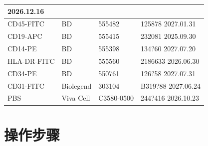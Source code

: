 \documentclass[UTF8,10pt,a4paper,fontset=fandol]{ctexart}
\newcommand{\fieldvalue}[1]{#1}
\newcommand{\handwritten}[1]{#1}
\begin{document}
\begin{center}
\begin{tabularx}{\textwidth}{|p{}|p{}|X|X|}
\fieldvalue{\handwritten{2026.12.16}} \\ \hline
CD45-FITC & BD & 555482 &
\fieldvalue{\handwritten{125878}}\quad
\fieldvalue{\handwritten{2027.01.31}} \\ \hline
CD19-APC & BD & 555415 &
\fieldvalue{\handwritten{232081}}\quad
\fieldvalue{\handwritten{2025.09.30}} \\ \hline
CD14-PE & BD & 555398 &
\fieldvalue{\handwritten{134?60}}\quad
\fieldvalue{\handwritten{2027.07.20}} \\ \hline
HLA-DR-FITC & BD & 555560 &
\fieldvalue{\handwritten{2186633}}\quad
\fieldvalue{\handwritten{2026.06.30}} \\ \hline
CD34-PE & BD & 550761 &
\fieldvalue{\handwritten{126?58}}\quad
\fieldvalue{\handwritten{2027.07.31}} \\ \hline
CD31-FITC & Biolegend & 303104 &
\fieldvalue{\handwritten{B319?88}}\quad
\fieldvalue{\handwritten{2027.06.24}} \\ \hline
PBS & Viva Cell & C3580-0500 &
\fieldvalue{\handwritten{244?416}}\quad
\fieldvalue{\handwritten{2026.10.23}} \\ \hline
\end{tabularx}
\end{center}

\section{操作步骤}
\end{document}
